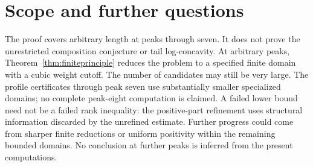 \section{Scope and further questions}
The proof covers arbitrary length at peaks through seven. It does not prove the unrestricted composition conjecture or tail log-concavity. At arbitrary peaks, Theorem~\ref{thm:finiteprinciple} reduces the problem to a specified finite domain with a cubic weight cutoff. The number of candidates may still be very large. The profile certificates through peak seven use substantially smaller specialized domains; no complete peak-eight computation is claimed. A failed lower bound need not be a failed rank inequality: the positive-part refinement uses structural information discarded by the unrefined estimate. Further progress could come from sharper finite reductions or uniform positivity within the remaining bounded domains. No conclusion at further peaks is inferred from the present computations.
